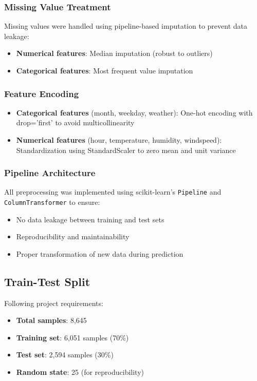 \documentclass[conference]{IEEEtran}
\begin{document}
\subsubsection{Missing Value Treatment}
Missing values were handled using pipeline-based imputation to prevent data leakage:
\begin{itemize}
    \item \textbf{Numerical features}: Median imputation (robust to outliers)
    \item \textbf{Categorical features}: Most frequent value imputation
\end{itemize}

\subsubsection{Feature Encoding}
\begin{itemize}
    \item \textbf{Categorical features} (month, weekday, weather): One-hot encoding with drop='first' to avoid multicollinearity
    \item \textbf{Numerical features} (hour, temperature, humidity, windspeed): Standardization using StandardScaler to zero mean and unit variance
\end{itemize}

\subsubsection{Pipeline Architecture}
All preprocessing was implemented using scikit-learn's \texttt{Pipeline} and \texttt{ColumnTransformer} to ensure:
\begin{itemize}
    \item No data leakage between training and test sets
    \item Reproducibility and maintainability
    \item Proper transformation of new data during prediction
\end{itemize}

\subsection{Train-Test Split}
Following project requirements:
\begin{itemize}
    \item \textbf{Total samples}: 8,645
    \item \textbf{Training set}: 6,051 samples (70\%)
    \item \textbf{Test set}: 2,594 samples (30\%)
    \item \textbf{Random state}: 25 (for reproducibility)
\end{itemize}
\end{document}
